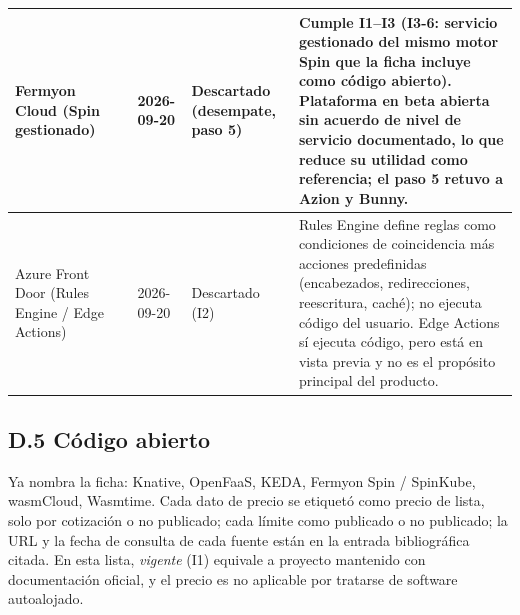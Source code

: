 \documentclass[12pt, letterpaper, table, xcdraw]{inf-pucv}
\begin{document}
{\begin{longtable}{|p{2.5cm}|p{2.4cm}|p{1.4cm}|p{2.3cm}|p{5.2cm}|}
    Fermyon Cloud (Spin gestionado) & \parencite{fermyon2026cloudpricing,fermyon2026cloudfaq} & 2026-09-20 & Descartado (desempate, paso 5) & Cumple I1--I3 (I3-6: servicio gestionado del mismo motor Spin que la ficha incluye como código abierto). Plataforma en beta abierta sin acuerdo de nivel de servicio documentado, lo que reduce su utilidad como referencia; el paso 5 retuvo a Azion y Bunny. \\ \hline
    Azure Front Door (Rules Engine / Edge Actions) & \parencite{microsoft2026frontdooredgeactions} & 2026-09-20 & Descartado (I2) & Rules Engine define reglas como condiciones de coincidencia más acciones predefinidas (encabezados, redirecciones, reescritura, caché); no ejecuta código del usuario. Edge Actions sí ejecuta código, pero está en vista previa y no es el propósito principal del producto. \\ \hline
\end{longtable}
}

\subsection*{D.5 Código abierto}

Ya nombra la ficha: Knative, OpenFaaS, KEDA, Fermyon Spin / SpinKube, wasmCloud, Wasmtime. Cada dato de precio se etiquetó como precio de lista, solo por cotización o no publicado; cada límite como publicado o no publicado; la URL y la fecha de consulta de cada fuente están en la entrada bibliográfica citada. En esta lista, \emph{vigente} (I1) equivale a proyecto mantenido con documentación oficial, y el precio es no aplicable por tratarse de software autoalojado.
\end{document}
